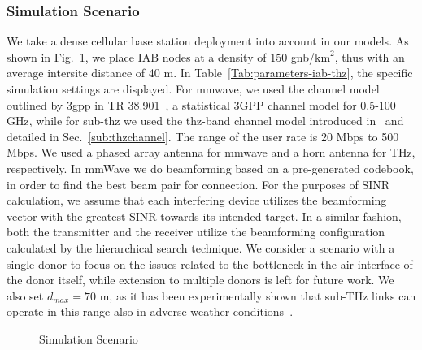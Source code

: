 \subsubsection{Simulation Scenario}
\label{sub:SimScenario}
We take a dense cellular base station deployment into account in our models. As shown in Fig.~\ref{fig:SimulationScenario}, we place IAB nodes at a density of $150$ \gls{gnb}/$\mathrm{km}^2$, thus with an average intersite distance of 40 m. 
In Table~\ref{Tab:parameters-iab-thz}, the specific simulation settings are displayed. For \gls{mmwave}, we used the channel model outlined by \gls{3gpp} in TR 38.901~\cite{3gpp.38.901}, a statistical 3GPP channel model for 0.5-100 GHz, while for sub-\gls{thz} we used the \gls{thz}-band channel model introduced in~\cite{5995306} and detailed in Sec.~\ref{sub:thzchannel}. The range of the user rate is 20 Mbps to 500 Mbps. 
We used a phased array antenna for \gls{mmwave} and a horn antenna for THz, respectively. In mmWave we do beamforming based on a pre-generated codebook, in order to find the best beam pair for connection. For the purposes of SINR calculation, we assume that each interfering device utilizes the beamforming vector with the greatest SINR towards its intended target. In a similar fashion, both the transmitter and the receiver utilize the beamforming configuration calculated by the hierarchical search technique.
We consider a scenario with a single donor to focus on the issues related to the bottleneck in the air interface of the donor itself, while extension to multiple donors is left for future work. We also set $d_{max} = 70$ m, as it has been experimentally shown that sub-THz links can operate in this range also in adverse weather conditions~\cite{sen2022terahertz}. 



\begin{figure}
    \centering
    \setlength{}
    \setlength{}
    
    \caption{Simulation Scenario}
    \label{fig:SimulationScenario}
\end{figure}

